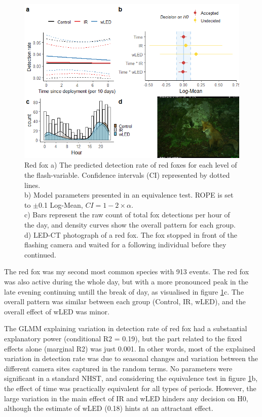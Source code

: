 \begin{table}[ht]
\begin{figure}
		  \centering
	\includegraphics[scale=.9]{../R/glmm_sp_files/figure-html/rev2-1.png}
\caption[Red fox]
{Red fox %
a) The predicted detection rate of red foxes for each level of the flash-variable. Confidence intervals (CI) represented by dotted lines.\\ 
b) Model parameters presented in an equivalence test. ROPE is set to $\pm$0.1 Log-Mean, $CI =1 - 2\times \alpha$.\\ 
c) Bars represent the raw count of total fox detections per hour of the day, and density curves show the overall pattern for each group.\\
d) LED-CT photograph of a red fox. The fox stopped in front of the flashing camera and waited for a following individual before they continued.}\label{fig:rev}
\end{figure}

The red fox was my second most common species with 913 events.
The red fox was also active during the whole day, but with a more pronounced peak in the late evening continuing untill the break of day, as visualised in figure \ref{fig:rev}c.
The overall pattern was similar between each group (Control, IR, wLED), and the overall effect of wLED was minor.

The GLMM explaining variation in detection rate of red fox had a substantial explanatory power (conditional R2 = 0.19), but the part related to the fixed effects alone (marginal R2) was just 0.001.
In other words, most of the explained variation in detection rate was due to seasonal changes and variation between the different camera sites captured in the random terms.
No parameters were significant in a standard NHST, and considering the equivalence test in figure \ref{fig:rev}b, the effect of time was practically equivalent for all types of periods.
However, the large variation in the main effect of  IR and wLED hinders any decision on H0, although the estimate of wLED (0.18) hints at an attractant effect.



\end{table}
